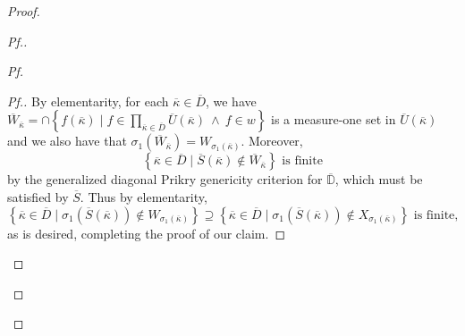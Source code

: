 \documentclass{amsart}
\theoremstyle{definition}
\theoremstyle{remark}
\newcommand{\D}{\mathbb{D}}
\renewcommand{\S}{{\overline{S}}}
\newcommand{\st}{\; | \;}
\newcommand{\set}[2]{\left\{#1\st #2 \right\}}
\begin{document}
\begin{proof}
\begin{proof}[Pf.]
\begin{proof}[Pf]
\begin{proof}[Pf.]
By elementarity, for each $\overline \kappa \in \overline D$, we have $\overline W_{\overline \kappa} = \cap \set{f(\overline \kappa) }{ f \in \prod_{\overline \kappa \in \overline D} \overline U(\overline \kappa) \ \land \ f \in w }$ is a measure-one set in $\overline U(\overline \kappa)$ and we also have that $\sigma_1(\overline W_{\overline \kappa}) = W_{\sigma_1(\overline \kappa)}$. Moreover, 
$$\set{\overline \kappa \in \overline D}{\overline S(\overline \kappa) \notin \overline W_{\overline \kappa}} \text{ is finite}$$ by the generalized diagonal Prikry genericity criterion for $\overline{\D}$, which must be satisfied by $\overline S$.
Thus by elementarity,
$$\set{ \overline \kappa \in \overline D }{ \sigma_1(\S(\overline \kappa)) \notin W_{\sigma_1(\overline \kappa)} } \supseteq \set{ \overline \kappa \in \overline D }{ \sigma_1(\S(\overline \kappa)) \notin X_{\sigma_1(\overline \kappa)}} \text{ is finite,}$$
as is desired, completing the proof of our claim.
\end{proof}







\end{proof}
\end{proof}
\end{proof}
\end{document}

